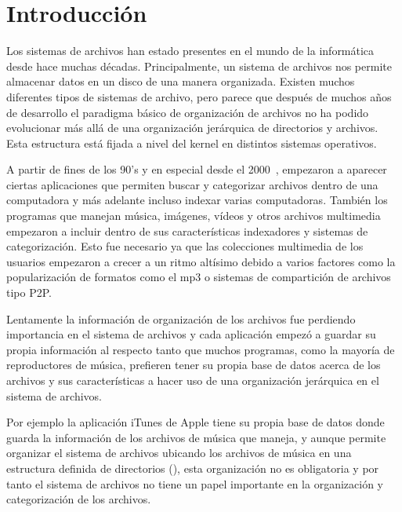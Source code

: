 \chapter{Introducción}
\ifpdf
    \graphicspath{{Introduction/IntroductionFigs/PNG/}{Introduction/IntroductionFigs/PDF/}{Introduction/IntroductionFigs/}}
\else
    \graphicspath{{Introduction/IntroductionFigs/EPS/}{Introduction/IntroductionFigs/}}
\fi

Los sistemas de archivos han estado presentes en el mundo de la informática desde hace muchas décadas. Principalmente, un sistema de archivos nos permite almacenar datos en un disco de una manera organizada. Existen muchos diferentes tipos de sistemas de archivo, pero parece que después de muchos años de desarrollo el paradigma básico de organización de archivos no ha podido evolucionar más allá de una organización jerárquica de directorios y archivos. Esta estructura está fijada a nivel del kernel en distintos sistemas operativos.

A partir de fines de los 90's y en especial desde el 2000~\cite{filesystem:wikipedia}, empezaron a aparecer ciertas aplicaciones que permiten buscar y categorizar archivos dentro de una computadora y más adelante incluso indexar varias computadoras. También los programas que manejan música, imágenes, vídeos y otros archivos multimedia empezaron a incluir dentro de sus características indexadores y sistemas de categorización. Esto fue necesario ya que las colecciones multimedia de los usuarios empezaron a crecer a un ritmo altísimo debido a varios factores como la popularización de formatos como el mp3 o sistemas de compartición de archivos tipo P2P.

Lentamente la información de organización de los archivos fue perdiendo importancia en el sistema de archivos y cada aplicación empezó a guardar su propia información al respecto tanto que muchos programas, como la mayoría de reproductores de música, prefieren tener su propia base de datos acerca de los archivos y sus características a hacer uso de una organización jerárquica en el sistema de archivos.

Por ejemplo la aplicación iTunes de Apple tiene su propia base de datos donde guarda la información de los archivos de música que maneja, y aunque permite organizar el sistema de archivos ubicando los archivos de música en una estructura definida de directorios (), esta organización no es obligatoria y por tanto el sistema de archivos no tiene un papel importante en la organización y categorización de los archivos.

